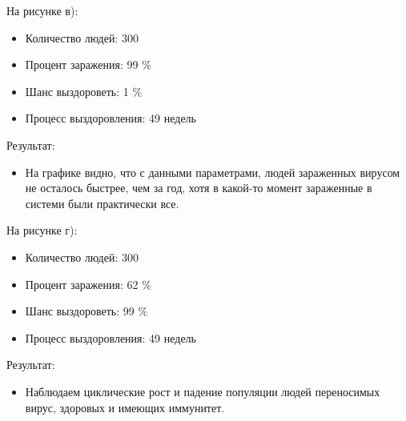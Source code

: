 \documentclass[14pt,a4paper,report]{report}
\begin{document}
На рисунке в):
\begin{itemize}
\item Количество людей: 300
\item Процент заражения: 99 \%
\item Шанс выздороветь: 1 \% 
\item Процесс выздоровления: 49 недель
\end{itemize}
Результат:
\begin{itemize}
\item На графике видно, что с данными параметрами, людей зараженных вирусом не осталось быстрее, чем за год, хотя в какой-то момент зараженные в системи были практически все. 
\end{itemize}


На рисунке г):
\begin{itemize}
\item Количество людей: 300
\item Процент заражения: 62 \%
\item Шанс выздороветь: 99 \%
\item Процесс выздоровления: 49 недель
\end{itemize}
Результат:
\begin{itemize}
\item   Наблюдаем циклические рост и падение популяции людей переносимых вирус, здоровых и имеющих иммунитет.
\end{itemize}
\clearpage
\end{document}

